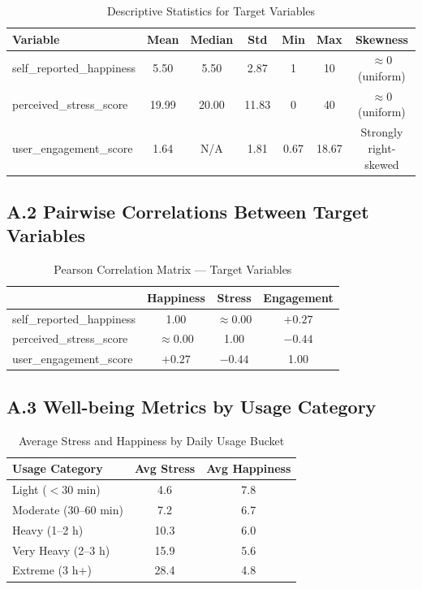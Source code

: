 \documentclass[12pt,a4paper]{article}
\begin{document}
\begin{table}[H]
\centering
\caption{Descriptive Statistics for Target Variables}
\begin{tabular}{lcccccc}
\toprule
\textbf{Variable} & \textbf{Mean} & \textbf{Median} & \textbf{Std} & \textbf{Min} & \textbf{Max} & \textbf{Skewness} \\
\midrule
self\_reported\_happiness  & 5.50  & 5.50  & 2.87  & 1  & 10    & $\approx 0$ (uniform) \\
perceived\_stress\_score   & 19.99 & 20.00 & 11.83 & 0  & 40    & $\approx 0$ (uniform) \\
user\_engagement\_score    & 1.64  & N/A   & 1.81  & 0.67 & 18.67 & Strongly right-skewed \\
\bottomrule
\end{tabular}
\end{table}
 
\subsection*{A.2 Pairwise Correlations Between Target Variables}
 
\begin{table}[H]
\centering
\caption{Pearson Correlation Matrix — Target Variables}
\begin{tabular}{lccc}
\toprule
 & \textbf{Happiness} & \textbf{Stress} & \textbf{Engagement} \\
\midrule
self\_reported\_happiness & 1.00 & $\approx 0.00$ & $+0.27$ \\
perceived\_stress\_score  & $\approx 0.00$ & 1.00 & $-0.44$ \\
user\_engagement\_score   & $+0.27$ & $-0.44$ & 1.00 \\
\bottomrule
\end{tabular}
\end{table}
 
\subsection*{A.3 Well-being Metrics by Usage Category}
 
\begin{table}[H]
\centering
\caption{Average Stress and Happiness by Daily Usage Bucket}
\begin{tabular}{lcc}
\toprule
\textbf{Usage Category} & \textbf{Avg Stress} & \textbf{Avg Happiness} \\
\midrule
Light ($<$30 min)          & 4.6  & 7.8 \\
Moderate (30--60 min)      & 7.2  & 6.7 \\
Heavy (1--2 h)             & 10.3 & 6.0 \\
Very Heavy (2--3 h)        & 15.9 & 5.6 \\
Extreme (3 h+)             & 28.4 & 4.8 \\
\bottomrule
\end{tabular}
\end{table}
 
\end{document}
